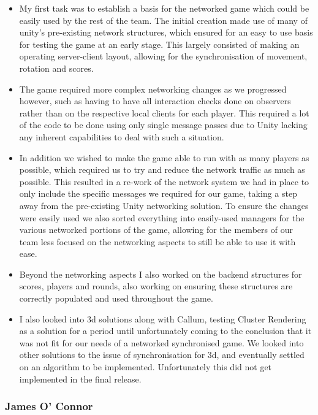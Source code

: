 \documentclass[11pt,a4paper]{article}
\begin{document}
        \begin{itemize}
          \item My first task was to establish a basis for the networked game which could be easily used by the rest of the team. The initial creation made use of many of unity’s pre-existing network structures, which ensured for an easy to use basis for testing the game at an early stage. This largely consisted of making an operating server-client layout, allowing for the synchronisation of movement, rotation and scores.

          \item The game required more complex networking changes as we progressed however, such as having to have all interaction checks done on observers rather than on the respective local clients for each player. This required a lot of the code to be done using only single message passes due to Unity lacking any inherent capabilities to deal with such a situation.

          \item In addition we wished to make the game able to run with as many players as possible, which required us to try and reduce the network traffic as much as possible. This resulted in a re-work of the network system we had in place to only include the specific messages we required for our game, taking a step away from the pre-existing Unity networking solution. To ensure the changes were easily used we also sorted everything into easily-used managers for the various networked portions of the game, allowing for the members of our team less focused on the networking aspects to still be able to use it with ease.

          \item Beyond the networking aspects I also worked on the backend structures for scores, players and rounds, also working on ensuring these structures are correctly populated and used throughout the game.

          \item I also looked into 3d solutions along with Callum, testing Cluster Rendering as a solution for a period until unfortunately coming to the conclusion that it was not fit for our needs of a networked synchronised game. We looked into other solutions to the issue of synchronisation for 3d, and eventually settled on an algorithm to be implemented. Unfortunately this did not get implemented in the final release.
        \end{itemize}

        \subsubsection{James O’ Connor}
\end{document}
